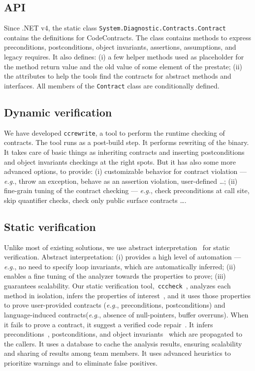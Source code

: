 \documentclass{sig-alternate-2013}
\begin{document}
\subsection{API}
Since .NET v$4$, the static class \texttt{System\-.Diagnostic\-.Con\-tracts\-.Contract} contains the definitions for CodeContracts.
The class contains methods to express preconditions, postconditions, object invariants, assertions, assumptions, and legacy requires.
It also defines: (i) a few helper methods used as placeholder for the method return value and the old value of some element of the prestate;
(ii) the attributes to help the tools find the contracts for abstract methods and interfaces.
All members of the \texttt{Contract} class are conditionally defined.

\subsection{Dynamic verification}
We have developed \texttt{ccrewrite}, a tool to perform the runtime checking of contracts.
The tool runs as a post-build step.
It performs   rewriting of the binary.
It takes care of basic things as inheriting contracts and inserting postconditions and object invariants checkings at the right spots.
But it has also  some more advanced options, to provide: (i) customizable behavior for contract violation --- \emph{e.g.}, throw an exception, behave as an assertion violation, user-defined \dots ; (ii) fine-grain tuning of the contract checking --- \emph{e.g.}, check preconditions at call site, skip quantifier checks, check only public surface contracts \dots.

\subsection{Static verification}
Unlike most of existing solutions, we use abstract interpretation~\cite{CousotCousot77} for static verification.
Abstract interpretation: (i) provides a high level of automation ---\emph{e.g.}, no  need to specify loop invariants, which are automatically inferred; (ii) enables a fine tuning of the analyzer towards the properties to prove; (iii) guarantees scalability.  
Our static verification tool,~\texttt{cccheck}~\cite{FahndrichLogozzo10}, analyzes each method in isolation, infers the properties of interest~\cite{subpolyhedra,FerraraLogozzoFahndrich-OOPSLA08,LogozzoFahndrich08-2,arrayal}, and it uses those properties to prove user-provided contracts (\emph{e.g.}, preconditions, postconditions) and language-induced  contracts(\emph{e.g.}, absence of null-pointers, buffer overruns).
When it fails to prove a contract, it suggest a verified code repair~\cite{LogozzoBall12}.
It infers preconditions~\cite{CousotCousotFahndrichLogozzo13}, postconditions, and object invariants~\cite{BouazizLogozzoFahndrich12} which are propagated to the callers.
It uses a database to cache the analysis results, ensuring scalability and sharing of results among team members.
It uses advanced heuristics to prioritize warnings and to eliminate false positives.
\end{document}
